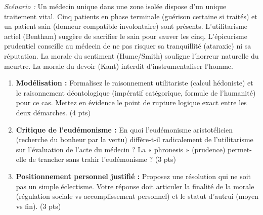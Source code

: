 \documentclass[11pt]{article}
\begin{document}
\begin{exercice}
    \textit{Scénario :} Un médecin unique dans une zone isolée dispose d'un unique traitement vital. Cinq patients en phase terminale (guérison certaine si traités) et un patient sain (donneur compatible involontaire) sont présents. L'utilitarisme actiel (Bentham) suggère de sacrifier le sain pour sauver les cinq. L'épicurisme prudentiel conseille au médecin de ne pas risquer sa tranquillité (ataraxie) ni sa réputation. La morale du sentiment (Hume/Smith) souligne l'horreur naturelle du meurtre. La morale du devoir (Kant) interdit d'instrumentaliser l'homme.
    \begin{enumerate}
        \item \textbf{Modélisation :} Formalisez le raisonnement utilitariste (calcul hédoniste) et le raisonnement déontologique (impératif catégorique, formule de l'humanité) pour ce cas. Mettez en évidence le point de rupture logique exact entre les deux démarches. (4 pts)
        \item \textbf{Critique de l'eudémonisme :} En quoi l'eudémonisme aristotélicien (recherche du bonheur par la vertu) diffère-t-il radicalement de l'utilitarisme sur l'évaluation de l'acte du médecin ? La « phronesis » (prudence) permet-elle de trancher sans trahir l'eudémonisme ? (3 pts)
        \item \textbf{Positionnement personnel justifié :} Proposez une résolution qui ne soit pas un simple éclectisme. Votre réponse doit articuler la finalité de la morale (régulation sociale vs accomplissement personnel) et le statut d'autrui (moyen vs fin). (3 pts)
    \end{enumerate}
\end{exercice}
\end{document}
